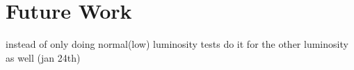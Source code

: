 \chapter{Future Work}
\label{sec:future}

instead of only doing normal(low) luminosity tests do it for the other luminosity as well (jan 24th)
